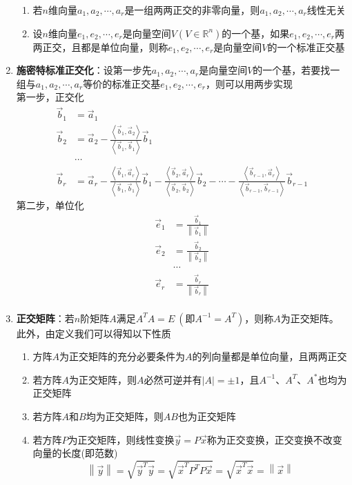 \documentclass[12pt,a4paper,UTF8]{book}
\begin{document}
\begin{enumerate}
\begin{enumerate}
\item 若$n$维向量$a_1,a_2,\cdots,a_r$是一组两两正交的非零向量，则$a_1,a_2,\cdots,a_r$线性无关
\item 设$n$维向量$e_1,e_2,\cdots,e_r$是向量空间$V\left(V\in\mathbb{R}^n\right)$的一个基，如果$e_1,e_2,\cdots,e_r$两两正交，且都是单位向量，则称$e_1,e_2,\cdots,e_r$是向量空间$V$的一个标准正交基
\end{enumerate}
\item \textbf{施密特标准正交化}：设第一步先$a_1,a_2,\cdots,a_r$是向量空间$V$的一个基，若要找一组与$a_1,a_2,\cdots,a_r$等价的标准正交基$e_1,e_2,\cdots,e_r$，则可以用两步实现\\
第一步，正交化
\[\begin{aligned}
\vec{b}_1&=\vec{a}_1\\
\vec{b}_2&=\vec{a}_2-\frac{\left<\vec{b}_1,\vec{a}_2\right>}{\left<\vec{b}_1,\vec{b}_1\right>}\vec{b}_1\\
&\cdots\\
\vec{b}_r&=\vec{a}_r-\frac{\left<\vec{b}_1,\vec{a}_r\right>}{\left<\vec{b}_1,\vec{b}_1\right>}\vec{b}_1-\frac{\left<\vec{b}_2,\vec{a}_r\right>}{\left<\vec{b}_2,\vec{b}_2\right>}\vec{b}_2-\cdots-\frac{\left<\vec{b}_{r-1},\vec{a}_r\right>}{\left<\vec{b}_{r-1},\vec{b}_{r-1}\right>}\vec{b}_{r-1}
\end{aligned}\]
第二步，单位化
\[\begin{aligned}
\vec{e}_1&=\frac{\vec{b}_1}{\left\|\vec{b}_1\right\|}\\
\vec{e}_2&=\frac{\vec{b}_2}{\left\|\vec{b}_2\right\|}\\
&\cdots\\
\vec{e}_r&=\frac{\vec{b}_r}{\left\|\vec{b}_r\right\|}\\
\end{aligned}\]
\item \textbf{正交矩阵}：若$n$阶矩阵$A$满足$A^TA=E\ \left(\text{即}A^{-1}=A^T\right)$，则称$A$为正交矩阵。此外，由定义我们可以得知以下性质
\begin{enumerate}
\item 方阵$A$为正交矩阵的充分必要条件为$A$的列向量都是单位向量，且两两正交
\item 若方阵$A$为正交矩阵，则$A$必然可逆并有$\left|A\right|=\pm1$，且$A^{-1}$、$A^T$、$A^*$也均为正交矩阵
\item 若方阵$A$和$B$均为正交矩阵，则$AB$也为正交矩阵
\item 若方阵$P$为正交矩阵，则线性变换$\vec{y}=P\vec{x}$称为正交变换，正交变换不改变向量的长度(即范数)
\[\left\|\vec{y}\right\|=\sqrt{\vec{y}^T\vec{y}}=\sqrt{\vec{x}^TP^TP\vec{x}}=\sqrt{\vec{x}^T\vec{x}}=\left\|\vec{x}\right\|\]
\end{enumerate}
\end{enumerate}
\end{document}

